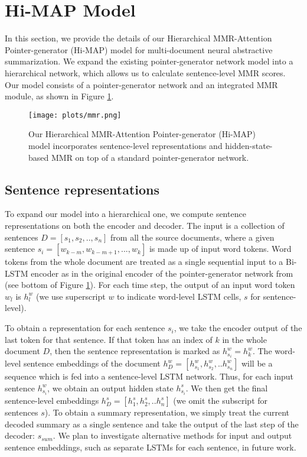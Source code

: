 \documentclass[11pt,a4paper]{article}
\begin{document}
\section{Hi-MAP Model}
In this section, we provide the details of our Hierarchical MMR-Attention Pointer-generator (Hi-MAP) model for  multi-document neural abstractive summarization. We expand the existing pointer-generator network model into a hierarchical network, which allows us to calculate sentence-level MMR scores. Our model consists of a pointer-generator network and an integrated MMR module, as shown in Figure \ref{fig:mmr}. 






\begin{figure}[t]
    \centering
    \texttt{[image: plots/mmr.png]}
    \caption{Our Hierarchical MMR-Attention Pointer-generator (Hi-MAP) model incorporates sentence-level representations and hidden-state-based MMR on top of a standard pointer-generator network.}
    \label{fig:mmr}
\end{figure} 



\subsection{Sentence representations}
To expand our model into a hierarchical one, we compute sentence representations on both the encoder and decoder. The input is a collection of sentences $D=[s_1,s_2,..,s_n]$ from all the source documents, where a given sentence $s_i=[w_{k-m},w_{k-m+1},...,w_k]$ is made up of input word tokens. Word tokens from the whole document are treated as a single sequential input to a Bi-LSTM encoder as in the original encoder of the pointer-generator network from  (see bottom of Figure \ref{fig:mmr}). For each time step, the output of an input word token ${w_l}$ is $h^{w}_{l}$ (we use superscript $w$ to indicate word-level LSTM cells, $s$ for sentence-level).


To obtain a representation for each sentence $s_i$, we take the encoder output of the last token for that sentence. If that token has an index of $k$ in the whole document $D$, then the sentence representation is marked as $h^{w}_{s_i}=h^{w}_{k}$. The word-level sentence embeddings of the document  $h^{w}_{D}=[h^{w}_{s_1},h^{w}_{s_2},..h^{w}_{s_n}]$ will be a sequence which is fed into a sentence-level LSTM network. Thus, for each input sentence $h^w_{s_i}$, we obtain an output hidden state $h^{s}_{s_i}$. We then get the final sentence-level embeddings $h^{s}_D = [h^{s}_{1},h^{s}_{2},..h^{s}_{n}]$ (we omit the subscript for sentences $s$). To obtain a summary representation, we simply treat the current decoded summary as a single sentence and take the output of the last step of the decoder: $s_{sum}$. We plan to investigate alternative methods for input and output sentence embeddings, such as separate LSTMs for each sentence, in future work.
\end{document}
